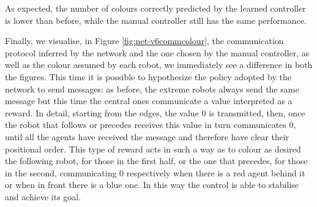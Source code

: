 \noindent
As expected, the number of colours correctly predicted by the learned controller 
is lower than before, while the manual controller still has the same performance.  

Finally, we visualise, in Figure \ref{fig:net-v6commcolour}, the communication 
protocol inferred by the network and the one chosen by the manual controller, as 
well as the colour assumed by each robot, we immediately see a difference in both 
the figures.
This time it is possible to hypothesize the policy adopted by the network to send 
messages: as before, the extreme robots always send the same message but this 
time the central ones communicate a value interpreted as a reward. In detail, 
starting from the edges, the value 0 is transmitted, then, once the robot that 
follows or precedes receives this value in turn communicates 0, until all the agents 
have received the message and therefore have clear their positional order.
This type of reward acts in such a way as to colour as desired the following robot, 
for those in the first half, or the one that precedes, for those in the second, 
communicating 0 respectively when there is a red agent behind it or when in front 
there is a blue one. In this way the control is able to stabilise and achieve its goal.
